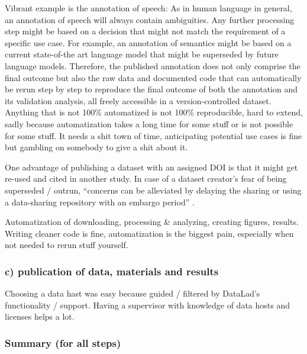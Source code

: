 %
Vibrant example is the annotation of speech:
%
As in human language in general, an annotation of speech will always contain
ambiguities.
%
Any further processing step might be based on a decision that might not match
the requirement of a specific use case.
%
For example, an annotation of semantics might be based on a current state-of-the
art language model that might be superseded by future language models.
%
Therefore, the published annotation does not only comprise the final outcome but
also the raw data and documented code that can automatically be rerun step by
step to reproduce the final outcome of both the annotation and its validation
analysis, all freely accessible in a version-controlled dataset.
%
Anything that is not 100\% automatized is not 100\% reproducible, hard to
extend, sadly because automatization takes a long time for some stuff or is not
possible for some stuff.
%
It needs a shit town of time, anticipating potential use cases is fine but
gambling on somebody to give a shit about it.

%
One advantage of publishing a dataset with an assigned DOI is that it might get
re-used and cited in another study.
%
In case of a dataset creator's fear of being superseded / outrun, ``concerns can
be alleviated by delaying the sharing or using a data-sharing repository with an
embargo period'' \citep{nichols2017best}.

%
Automatization of downloading, processing \& analyzing, creating figures,
results.
%
Writing cleaner code is fine, automatization is the biggest pain, especially
when not needed to rerun stuff yourself.


\subsubsection{c) publication of data, materials and results}




%
Choosing a data hast was easy because guided / filtered by DataLad's
functionality / support.
%
Having a supervisor with knowledge of data hosts and licenses helps a lot.



\subsubsection{Summary (for all steps)}

